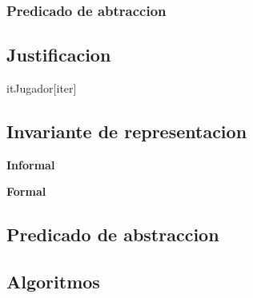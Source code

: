 \begin{Representacion}
\subsubsection{Predicado de abtraccion}

\subsection{Justificacion}

	\begin{Estructura}{itJugador}[iter]
		\begin{Tupla}[iter]
		\end{Tupla}
	\end{Estructura}
\subsection{Invariante de representacion}

\textbf{Informal}

\textbf{Formal}

\subsection{Predicado de abstraccion}

\end{Representacion}
\subsection{Algoritmos}

